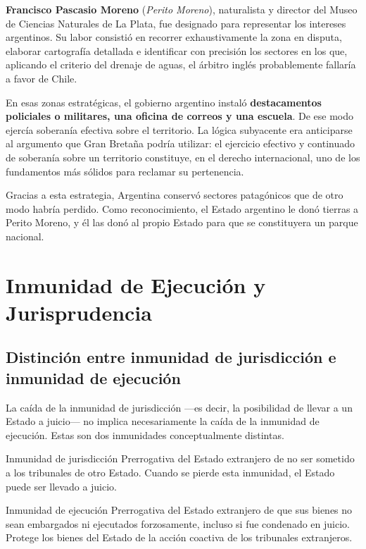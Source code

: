 \documentclass[12pt,oneside]{book}
\begin{document}
\textbf{Francisco Pascasio Moreno} (\textit{Perito Moreno}), naturalista y director del Museo de Ciencias Naturales de La Plata, fue designado para representar los intereses argentinos. Su labor consistió en recorrer exhaustivamente la zona en disputa, elaborar cartografía detallada e identificar con precisión los sectores en los que, aplicando el criterio del drenaje de aguas, el árbitro inglés probablemente fallaría a favor de Chile.

En esas zonas estratégicas, el gobierno argentino instaló \textbf{destacamentos policiales o militares, una oficina de correos y una escuela}. De ese modo ejercía soberanía efectiva sobre el territorio. La lógica subyacente era anticiparse al argumento que Gran Bretaña podría utilizar: el ejercicio efectivo y continuado de soberanía sobre un territorio constituye, en el derecho internacional, uno de los fundamentos más sólidos para reclamar su pertenencia.

Gracias a esta estrategia, Argentina conservó sectores patagónicos que de otro modo habría perdido. Como reconocimiento, el Estado argentino le donó tierras a Perito Moreno, y él las donó al propio Estado para que se constituyera un parque nacional.

\chapter{Inmunidad de Ejecución y Jurisprudencia}

\section{Distinción entre inmunidad de jurisdicción e inmunidad de ejecución}

La caída de la inmunidad de jurisdicción —es decir, la posibilidad de llevar a un Estado a juicio— no implica necesariamente la caída de la inmunidad de ejecución. Estas son dos inmunidades conceptualmente distintas.

\begin{definition}{Inmunidad de jurisdicción}
Prerrogativa del Estado extranjero de no ser sometido a los tribunales de otro Estado. Cuando se pierde esta inmunidad, el Estado puede ser llevado a juicio.
\end{definition}

\begin{definition}{Inmunidad de ejecución}
Prerrogativa del Estado extranjero de que sus bienes no sean embargados ni ejecutados forzosamente, incluso si fue condenado en juicio. Protege los bienes del Estado de la acción coactiva de los tribunales extranjeros.
\end{definition}
\end{document}
